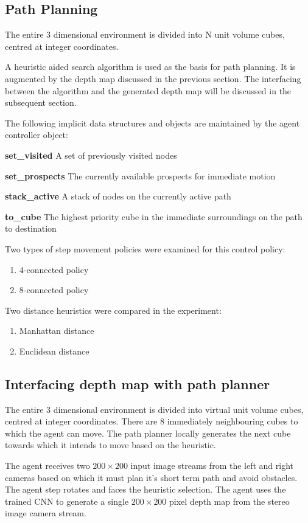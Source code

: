 \subsection{Path Planning}
The entire 3 dimensional environment is divided into N unit volume cubes, centred at integer coordinates.
 
A heuristic aided search algorithm is used as the basis for path planning. It is augmented by the depth map discussed in the previous section. The interfacing between the algorithm and the generated depth map will be discussed in the subsequent section.

The following implicit data structures and objects are maintained by the agent controller object:
 
\textbf{set\_visited}
A set of previously visited nodes
 
\textbf{set\_prospects}
The currently available prospects for immediate motion
 
\textbf{stack\_active}
A stack of nodes on the currently active path
 
\textbf{to\_cube}
The highest priority cube in the immediate surroundings on the path to destination

Two types of step movement policies were examined for this control policy:
\begin{enumerate}
\item 4-connected policy
\item 8-connected policy
\end{enumerate}

Two distance heuristics were compared in the experiment:
\begin{enumerate}
\item Manhattan distance
\item Euclidean distance
\end{enumerate}

\subsection{Interfacing depth map with path planner}

The entire 3 dimensional environment is divided into virtual unit volume cubes, centred at integer coordinates. There are 8 immediately neighbouring cubes to which the agent can move. The path planner locally generates the next cube towards which it intends to move based on the heuristic.

The agent receives two $200\times200$ input image streams from the left and right cameras based on which it must plan it's short term path and avoid obstacles. The agent step rotates and faces the heuristic selection. The agent uses the trained CNN to generate a single $200\times200$ pixel depth map from the stereo image camera stream.

